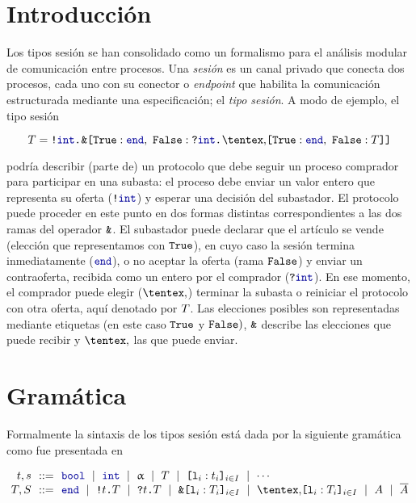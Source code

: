 \section{Introducción}

Los tipos sesión se han consolidado como un formalismo para el
análisis modular de comunicación entre procesos. Una \emph{sesión} es un canal
privado que conecta dos procesos, cada uno con su conector o \emph{endpoint}
que habilita la comunicación estructurada mediante una especificación; el
\emph{tipo sesión}. A modo de ejemplo, el tipo sesión

\begin{equation}
    \label{eq:bare.auction}
    \T = \Out\tint{
        \BinaryPBranch[]\End{
            \In\tint{
                \BinaryPChoice[]\End\T
            }
        }
    }
\end{equation}

\noindent podría describir (parte de) un protocolo que debe seguir un proceso
comprador para participar en una subasta: el proceso debe enviar un valor entero
que representa su oferta ($ \Out [] \tint $) y esperar una decisión del
subastador. El protocolo puede proceder en este punto en dos formas distintas
correspondientes a las dos ramas del operador $\Branch$. El subastador puede
declarar que el artículo se vende (elección que representamos con $\Tag[True]$),
en cuyo caso la sesión termina inmediatamente ($ \End $), o no aceptar la oferta
(rama $\Tag[False]$) y enviar un contraoferta, recibida como un entero por el
comprador ($ \In [] \tint $). En ese momento, el comprador puede elegir
($\Choice$) terminar la subasta o reiniciar el protocolo con otra oferta, aquí
denotado por $\T$. Las elecciones posibles son representadas mediante etiquetas
(en este caso $\Tag[True]$ y $\Tag[False])$, $\Branch$ describe las elecciones
que puede recibir y $\Choice$ las que puede enviar.

\section{Gramática}

Formalmente la sintaxis de los tipos sesión está dada por la siguiente
gramática como fue presentada en~\cite{Melgratti2017AnOI}

\[
\begin{array}{@{}r@{~~}c@{~~}l@{}}
\TypeT, \TypeS & ::= &
\tbool
\rulemid \tint
\rulemid \tvar
\rulemid \SessionType
\rulemid \set[i\in I]{ \Tag_i : \Type_i }
\rulemid \cdots
\\
\SessionTypeT, \SessionTypeS & ::= &
\End
\rulemid \Out\Type\SessionType
\rulemid \In\Type\SessionType
\rulemid \Branch \set[i\in I]{\Tag_i : \SessionType_i}
\rulemid \Choice \set[i\in I]{\Tag_i : \SessionType_i}
\rulemid \etvar
\rulemid \dual\etvar
\end{array}
\]

